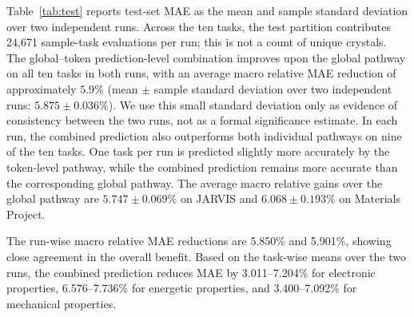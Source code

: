 \documentclass[a4paper,fleqn]{cas-sc}
\begin{document}
Table~\ref{tab:test} reports test-set MAE as the mean and sample standard deviation over two independent runs. Across the ten tasks, the test partition contributes 24,671 sample-task evaluations per run; this is not a count of unique crystals. The global--token prediction-level combination improves upon the global pathway on all ten tasks in both runs, with an average macro relative MAE reduction of approximately $5.9\%$ (mean $\pm$ sample standard deviation over two independent runs: $5.875\pm0.036\%$). We use this small standard deviation only as evidence of consistency between the two runs, not as a formal significance estimate. In each run, the combined prediction also outperforms both individual pathways on nine of the ten tasks. One task per run is predicted slightly more accurately by the token-level pathway, while the combined prediction remains more accurate than the corresponding global pathway. The average macro relative gains over the global pathway are $5.747\pm0.069\%$ on JARVIS and $6.068\pm0.193\%$ on Materials Project.

The run-wise macro relative MAE reductions are 5.850\% and 5.901\%, showing close agreement in the overall benefit. Based on the task-wise means over the two runs, the combined prediction reduces MAE by 3.011--7.204\% for electronic properties, 6.576--7.736\% for energetic properties, and 3.400--7.092\% for mechanical properties.
\end{document}
